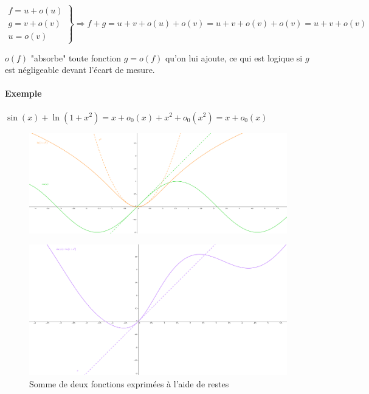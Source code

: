 \documentclass[]{article}
\begin{document}
\begin{enumerate}
	$$\left. \begin{array}{c}
		f = u + o(u) \\
		g = v + o(v) \\
		u=o(v)
	\end{array} \right\} \Longrightarrow f + g = u + v + o(u) + o(v) = u + v + o(v) + o(v) = u + v + o(v)$$

	$o(f)$ "absorbe" toute fonction $g=o(f)$ qu'on lui ajoute, ce qui est logique si $g$ est négligeable devant l'écart de mesure.

	\paragraph{Exemple}
	$\sin(x)+\ln(1+x^2)=x+o_0(x)+x^2+o_0(x^2)=x+o_0(x)$

	\begin{figure}[!h]
		\includegraphics[width=500pt]{Images/SommeResteGrossier1}
	\end{figure}

	\begin{figure}[!h]
		\includegraphics[width=500pt]{Images/SommeResteGrossier2}
		\caption{Somme de deux fonctions exprimées à l'aide de restes}
	\end{figure}
\end{enumerate}

\newpage
\end{document}
